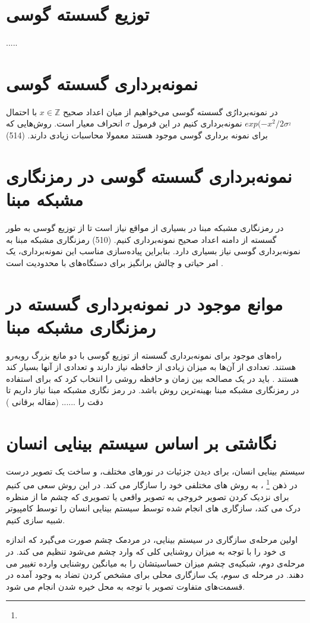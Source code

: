 
\section{توزیع گسسته گوسی }
.....

\section{نمونه‌برداری گسسته گوسی  }

در نمونه‌بردارُی گسسته گوسی می‌خواهیم از میان اعداد صحیح  $x \in \mathbb{Z}$ با احتمال$exp(-x^{2}/2\sigma^_{2}$ نمونه‌برداری کنیم در این فرمول  $\sigma$ انحراف معیار است. روش‌هایی که برای نمونه برداری گوسی موجود هستند معمولا محاسبات زیادی دارند. (514)


\section{نمونه‌برداری گسسته گوسی در رمزنگاری مشبکه مبنا  }
در رمزنگاری مشبکه مبنا در بسیاری از مواقع نیاز است تا از توزیع  گوسی به طور گسسته از دامنه اعداد صحیح نمونه‌برداری کنیم. (510)
 رمزنگاری مشبکه مبنا به نمونه‌برداری گوسی نیاز بسیاری دارد. بنابراین پیاده‌سازی مناسب این نمونه‌برداری، یک امر حیاتی و چالش برانگیز برای دستگاه‌های با محدودیت است .


\section{موانع موجود در نمونه‌برداری گسسته  در رمزنگاری مشبکه مبنا }
راه‌های موجود برای نمونه‌برداری گسسته از توزیع گوسی با دو مانع بزرگ روبه‌رو هستند. تعدادی از آن‌ها به میزان زیادی از حافظه نیاز دارند و تعدادی از آنها بسیار کند هستند . باید در یک مصالحه بین زمان و حافظه روشی را انتخاب کرد که برای استفاده در رمزنگاری مشبکه مبنا بهینه‌ترین روش باشد. 
در رمز نگاری مشبکه مبنا نیاز داریم تا دقت را ...... (مقاله برقانی )

\section{نگاشتی بر اساس سیستم بینایی انسان}
سیستم بینایی انسان، برای دیدن جزئیات در نورهای مختلف، و ساخت یک تصویر درست در ذهن
\footnote{}
، به روش های مختلفی خود را سازگار می کند.
 در این روش سعی می کنیم برای نزدیک کردن تصویر خروجی به تصویر واقعی یا تصویری که چشم ما از منظره درک می کند، سازگاری های انجام شده توسط سیستم بینایی انسان را توسط کامپیوتر شبیه سازی کنیم. 
 
 اولین مرحله‌ی سازگاری در سیستم بینایی، در مردمک چشم صورت می‌گیرد که اندازه ی خود را با توجه به میزان روشنایی کلی که وارد چشم می‌شود تنظیم می کند. در مرحله‌ی دوم، شبکیه‌ی چشم میزان حساسیتشان را به میانگین روشنایی وارده تغییر می دهند. در مرحله ی سوم، یک سازگاری محلی برای مشخص کردن تضاد به وجود آمده در قسمت‌های متفاوت تصویر با توجه به محل خیره شدن انجام می شود.
 
